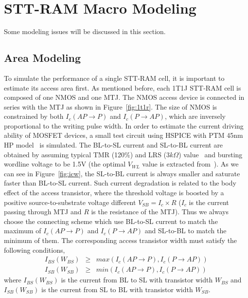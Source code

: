 \section{STT-RAM Macro Modeling} \label{sec:model}
Some modeling issues will be discussed in this section.

\subsection{Area Modeling}
To simulate the performance of a single STT-RAM cell, it is important to estimate its access area first. As mentioned before, each 1T1J STT-RAM cell is composed of one NMOS and one MTJ. The NMOS access device is connected in series with the MTJ as shown in Figure~\ref{fig:1t1r}. The size of NMOS is constrained by both $I_{c}(AP\rightarrow P)$ and $I_{c}(P\rightarrow AP)$, which are inversely proportional to the writing pulse width. In order to estimate the current driving ability of MOSFET devices, a small test circuit using HSPICE with PTM 45nm HP model~\cite{PTM} is simulated. The BL-to-SL current and SL-to-BL current are obtained by assuming typical TMR (120\%) and LRS ($3k\Omega$) value~\cite{STTRAM:Qualcomm09} and bursting wordline voltage to be 1.5V (the optimal $V_{WL}$ value is extracted from~\cite{STTRAM:Gatech10}). As we can see in Figure~\ref{fig:icw}, the SL-to-BL current is always smaller and saturate faster than BL-to-SL current. Such current degradation is related to the body effect of the access transistor, where the threshold voltage is boosted by a positive source-to-substrate voltage different $V_{SB}=I_{c}\times R$ ($I_{c}$ is the current passing through MTJ and $R$ is the resistance of the MTJ). Thus we always choose the connecting scheme which use BL-to-SL current to match the maximum of $I_{c}(AP\rightarrow P)$ and $I_{c}(P\rightarrow AP)$ and SL-to-BL to match the minimum of them. The corresponding access transistor width must satisfy the following conditions,
\begin{eqnarray}
I_{BS}(W_{BS}) &\geq& max(I_{c}(AP\rightarrow P), I_{c}(P\rightarrow AP)) \\
I_{SB}(W_{SB}) &\geq& min(I_{c}(AP\rightarrow P), I_{c}(P\rightarrow AP))
\end{eqnarray}
where $I_{BS}(W_{BS})$ is the current from BL to SL with transistor width $W_{BS}$ and $I_{SB}(W_{SB})$ is the current from SL to BL with transistor width $W_{SB}$.

